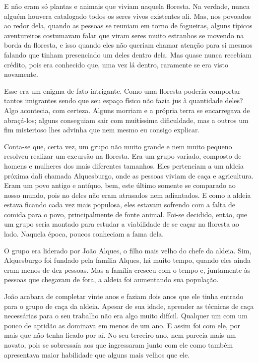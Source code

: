 E não eram só plantas e animais que viviam naquela floresta. Na verdade, nunca alguém houvera catalogado todos os seres vivos existentes ali. Mas, nos povoados ao redor dela, quando as pessoas se reuniam em torno de fogueiras, alguns típicos aventureiros costumavam falar que viram seres muito estranhos se movendo na borda da floresta, e isso quando eles não queriam chamar atenção para si mesmos falando que tinham presenciado um deles dentro dela. Mas quase nunca recebiam crédito, pois era conhecido que, uma vez lá dentro, raramente se era visto novamente.

Esse era um enigma de fato intrigante. Como uma floresta poderia comportar tantos imigrantes sendo que seu espaço físico não fazia jus à quantidade deles? Algo acontecia, com certeza. Alguns morriam e a própria terra se encarregava de abraçá-los; alguns conseguiam sair com muitíssima dificuldade, mas a outros um fim misterioso lhes advinha que nem mesmo eu consigo explicar.

Conta-se que, certa vez, um grupo não muito grande e nem muito pequeno resolveu realizar um excursão na floresta. Era um grupo variado, composto de homens e mulheres dos mais diferentes tamanhos. Eles pertenciam a um aldeia próxima dali chamada Alquesburgo, onde as pessoas viviam de caça e agricultura. Eram um povo antigo e antíquo, bem, este último somente se comparado ao nosso mundo, pois no deles não eram atrasados nem adiantados. E como a aldeia estava ficando cada vez mais populosa, eles estavam sofrendo com a falta de comida para o povo, principalmente de fonte animal. Foi-se decidido, então, que um grupo seria montado para estudar a viabilidade de se caçar na floresta ao lado. Naquela época, poucos conheciam a fama dela.

O grupo era liderado por João Alques, o filho mais velho do chefe da aldeia. Sim, Alquesburgo foi fundado pela família Alques, há muito tempo, quando eles ainda eram menos de dez pessoas. Mas a família cresceu com o tempo e, juntamente às pessoas que chegavam de fora, a aldeia foi aumentando sua população.

João acabara de completar vinte anos e faziam dois anos que ele tinha entrado para o grupo de caça da aldeia. Apesar de sua idade, aprender as técnicas de caça necessárias para o seu trabalho não era algo muito difícil. Qualquer um com um pouco de aptidão as dominava em menos de um ano. E assim foi com ele, por mais que não tenha ficado por aí. No seu terceiro ano, nem parecia mais um novato, pois se sobressaía aos que ingressaram junto com ele como também apresentava maior habilidade que alguns mais velhos que ele.

